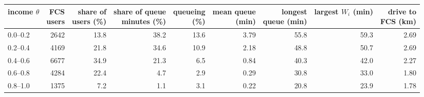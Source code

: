 \begin{tabular}{@{}lrrrrrrrr@{}}
\toprule
income $\theta$ & \shortstack[r]{FCS\\users} & \shortstack[r]{share of\\users (\%)} & \shortstack[r]{share of queue\\minutes (\%)} & \shortstack[r]{queueing\\(\%)} & \shortstack[r]{mean queue\\(min)} & \shortstack[r]{longest\\queue (min)} & \shortstack[r]{largest\\$W_i$ (min)} & \shortstack[r]{drive to\\FCS (km)} \\
\midrule
0.0--0.2 & 2642 & 13.8 & 38.2 & 13.6 & 3.79 & 55.8 & 59.3 & 2.69 \\
0.2--0.4 & 4169 & 21.8 & 34.6 & 10.9 & 2.18 & 48.8 & 50.7 & 2.69 \\
0.4--0.6 & 6677 & 34.9 & 21.3 & 6.5 & 0.84 & 40.3 & 42.0 & 2.27 \\
0.6--0.8 & 4284 & 22.4 & 4.7 & 2.9 & 0.29 & 30.8 & 33.0 & 1.80 \\
0.8--1.0 & 1375 & 7.2 & 1.1 & 3.1 & 0.22 & 20.8 & 23.9 & 1.78 \\
\bottomrule
\end{tabular}
